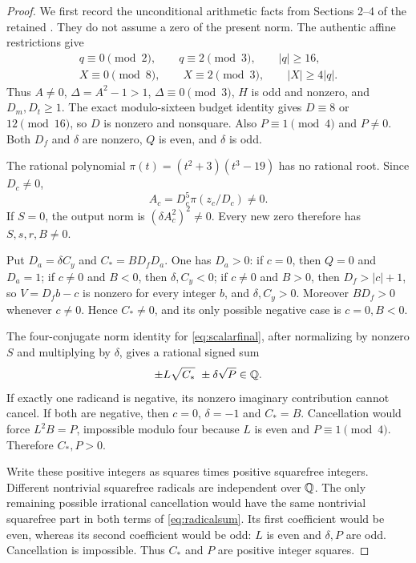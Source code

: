 \begin{proof}
We first record the unconditional arithmetic facts from Sections 2--4
of the retained . They do not
assume a zero of the present norm. The authentic affine restrictions give
\begin{gather*}
 q\equiv0\pmod2,\qquad q\equiv2\pmod3,\qquad |q|\ge16,\\
 X\equiv0\pmod8,\qquad X\equiv2\pmod3,\qquad |X|\ge4|q|.
\end{gather*}
Thus $A\ne0$, $\Delta=A^2-1>1$, $\Delta\equiv0\pmod3$,
$H$ is odd and nonzero, and $D_m,D_t\ge1$. The exact modulo-sixteen
budget identity gives $D\equiv8$ or $12\pmod{16}$, so $D$ is nonzero
and nonsquare. Also $P\equiv1\pmod4$ and $P\ne0$.
Both $D_f$ and $\delta$ are nonzero, $Q$ is even, and $\delta$ is odd.

The rational polynomial $\pi(t)=(t^2+3)(t^3-19)$ has no rational root.
Since $D_c\ne0$,
\[
 A_c=D_c^5\pi(z_c/D_c)\ne0.
\]
If $S=0$, the output norm is $(\delta A_c^2)^2\ne0$.
Every new zero therefore has $S,s,r,B\ne0$.

Put $D_a=\delta C_y$ and $C_*=BD_fD_a$. One has $D_a>0$:
if $c=0$, then $Q=0$ and $D_a=1$; if $c\ne0$ and $B<0$,
then $\delta,C_y<0$; if $c\ne0$ and $B>0$, then
$D_f>|c|+1$, so $V=D_fb-c$ is nonzero for every integer $b$, and
$\delta,C_y>0$. Moreover $BD_f>0$ whenever $c\ne0$.
Hence $C_*\ne0$, and its only possible negative case is $c=0,B<0$.

The four-conjugate norm identity for \eqref{eq:scalarfinal}, after
normalizing by nonzero $S$ and multiplying by $\delta$, gives a rational
signed sum
\begin{equation}\label{eq:radicalsum}
 \pm L\sqrt{C_*}\ \pm\delta\sqrt P\in\mathbb Q.
\end{equation}
If exactly one radicand is negative, its nonzero imaginary contribution
cannot cancel. If both are negative, then $c=0$, $\delta=-1$ and
$C_*=B$. Cancellation would force $L^2B=P$, impossible modulo four
because $L$ is even and $P\equiv1\pmod4$. Therefore $C_*,P>0$.

Write these positive integers as squares times positive squarefree integers.
Different nontrivial squarefree radicals are independent over $\mathbb Q$.
The only remaining possible irrational cancellation would have the same
nontrivial squarefree part in both terms of \eqref{eq:radicalsum}.
Its first coefficient would be even, whereas its second coefficient would
be odd: $L$ is even and $\delta,P$ are odd. Cancellation is impossible.
Thus $C_*$ and $P$ are positive integer squares.


\end{proof}

